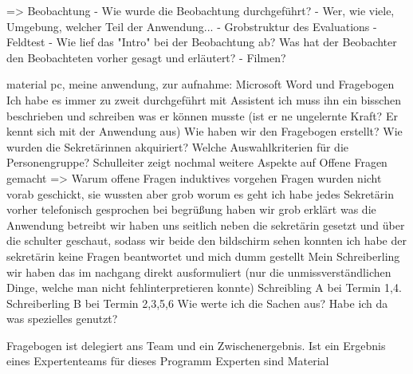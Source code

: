  => Beobachtung
 		- Wie wurde die Beobachtung durchgeführt?
 			- Wer, wie viele, Umgebung, welcher Teil der Anwendung...
 			- Grobstruktur des Evaluations
 			- Feldtest 
 			- Wie lief das "Intro" bei der Beobachtung ab? Was hat der Beobachter den Beobachteten vorher gesagt und erläutert?
 		- Filmen?

material
pc, meine anwendung, 
zur aufnahme: Microsoft Word und Fragebogen
Ich habe es immer zu zweit durchgeführt mit Assistent
ich muss ihn ein bisschen beschrieben und schreiben was er können musste (ist er ne ungelernte Kraft? Er kennt sich mit der Anwendung aus)
Wie haben wir den Fragebogen erstellt? 
Wie wurden die Sekretärinnen akquiriert?
Welche Auswahlkriterien für die Personengruppe?
Schulleiter zeigt nochmal weitere Aspekte auf
Offene Fragen gemacht => Warum offene Fragen
induktives vorgehen
Fragen wurden nicht vorab geschickt, sie wussten aber grob worum es geht
ich habe jedes Sekretärin vorher telefonisch gesprochen
bei begrüßung haben wir grob erklärt was die Anwendung betreibt 
wir haben uns seitlich neben die sekretärin gesetzt und über die schulter geschaut, sodass wir beide den bildschirm sehen konnten
ich habe der sekretärin keine Fragen beantwortet und mich dumm gestellt
Mein Schreiberling wir haben das im nachgang direkt ausformuliert (nur die unmissverständlichen Dinge, welche man nicht fehlinterpretieren konnte)
Schreibling A bei Termin 1,4. Schreiberling B bei Termin 2,3,5,6
Wie werte ich die Sachen aus? Habe ich da was spezielles genutzt? 


Fragebogen ist delegiert ans Team und ein Zwischenergebnis. Ist ein Ergebnis eines Expertenteams für dieses Programm
Experten sind Material

